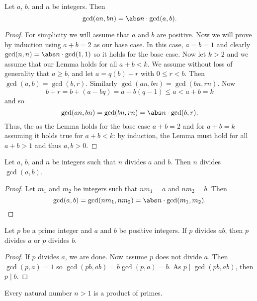 \begin{lemma}[]
	Let $a$, $b$, and $n$ be integers.
	Then
	\[
		\gcd(an, bn) = \abs n \cdot \gcd(a, b).
	\]
\end{lemma}

\begin{proof}
	For simplicity we will assume that $a$ and $b$ are positive.
	Now we will prove by induction using $a + b = 2$ as our base case.
	In this case, $a = b = 1$ and clearly $
		\gcd(n, n) = \abs n \cdot \gcd(1, 1)
	$
	so it holds for the base case.
	Now let $k > 2$ and we assume that our Lemma holds for all $a + b < k$.
	We assume without loss of generality that $a \geq b$,
	and let $a = q(b) + r$ with $0 \leq r < b$.
	Then $\gcd(a, b) = \gcd(b, r)$.
	Similarly $
		\gcd(an, bn) = \gcd(bn, rn)
	$. Now \[
		b + r = b + (a - bq) = a - b(q - 1) \leq a < a + b = k
	\] and so \[
		\gcd(an, bn) = \gcd(bn, rn) = \abs n \cdot \gcd(b, r).
	\]
	Thus, the as the Lemma holds for the base case $a + b = 2$ and
	for $a + b = k$ assuming it holds true for $a + b < k$: by induction, 
	the Lemma must hold for all $a + b > 1$ and thus $a, b > 0$.
\end{proof}

\begin{lemma}[Euclid's]
	Let $a$, $b$, and $n$ be integers such that $n$ divides $a$ and $b$.
	Then $n$ divides $\gcd(a, b)$.
\end{lemma}

\begin{proof}
	Let $m_1$ and $m_2$ be integers such that $nm_1 = a$ and $nm_2 = b$.
	Then
	\[
		\gcd(a,b) = \gcd(nm_1, nm_2) = \abs n \cdot \gcd(m_1, m_2).
	\]
\end{proof}

\begin{theorem}[]
	Let $p$ be a prime integer and $a$ and $b$ be positive integers.
	If $p$ divides $ab$, then $p$ divides $a$ or $p$ divides $b$.
\end{theorem}

\begin{proof}
	If $p$ divides $a$, we are done.
	Now assume $p$ does not divide $a$.
	Then $\gcd(p, a) = 1$ so
	$\gcd(pb, ab) = b \gcd(p, a) = b$.
	As $p \mid \gcd(pb, ab)$, then $p \mid b$.
\end{proof}

\begin{proposition}[]
	\label{prop:nat-primes}
	Every natural number $n > 1$ is a product of primes.
\end{proposition}


